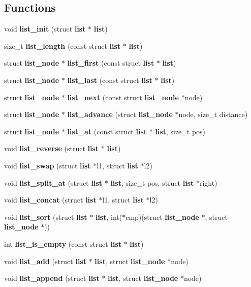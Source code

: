 \subsection*{Functions}
\begin{DoxyCompactItemize}
\item 
void \textbf{ list\+\_\+init} (struct \textbf{ list} $\ast$\textbf{ list})
\item 
size\+\_\+t \textbf{ list\+\_\+length} (const struct \textbf{ list} $\ast$\textbf{ list})
\item 
struct \textbf{ list\+\_\+node} $\ast$ \textbf{ list\+\_\+first} (const struct \textbf{ list} $\ast$\textbf{ list})
\item 
struct \textbf{ list\+\_\+node} $\ast$ \textbf{ list\+\_\+last} (const struct \textbf{ list} $\ast$\textbf{ list})
\item 
struct \textbf{ list\+\_\+node} $\ast$ \textbf{ list\+\_\+next} (const struct \textbf{ list\+\_\+node} $\ast$node)
\item 
struct \textbf{ list\+\_\+node} $\ast$ \textbf{ list\+\_\+advance} (struct \textbf{ list\+\_\+node} $\ast$node, size\+\_\+t distance)
\item 
struct \textbf{ list\+\_\+node} $\ast$ \textbf{ list\+\_\+at} (const struct \textbf{ list} $\ast$\textbf{ list}, size\+\_\+t pos)
\item 
void \textbf{ list\+\_\+reverse} (struct \textbf{ list} $\ast$\textbf{ list})
\item 
void \textbf{ list\+\_\+swap} (struct \textbf{ list} $\ast$l1, struct \textbf{ list} $\ast$l2)
\item 
void \textbf{ list\+\_\+split\+\_\+at} (struct \textbf{ list} $\ast$\textbf{ list}, size\+\_\+t pos, struct \textbf{ list} $\ast$right)
\item 
void \textbf{ list\+\_\+concat} (struct \textbf{ list} $\ast$l1, struct \textbf{ list} $\ast$l2)
\item 
void \textbf{ list\+\_\+sort} (struct \textbf{ list} $\ast$\textbf{ list}, int($\ast$cmp)(struct \textbf{ list\+\_\+node} $\ast$, struct \textbf{ list\+\_\+node} $\ast$))
\item 
int \textbf{ list\+\_\+is\+\_\+empty} (const struct \textbf{ list} $\ast$\textbf{ list})
\item 
void \textbf{ list\+\_\+add} (struct \textbf{ list} $\ast$\textbf{ list}, struct \textbf{ list\+\_\+node} $\ast$node)
\item 
void \textbf{ list\+\_\+append} (struct \textbf{ list} $\ast$\textbf{ list}, struct \textbf{ list\+\_\+node} $\ast$node)

\end{DoxyCompactItemize}
